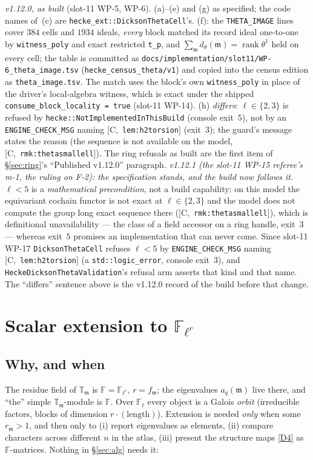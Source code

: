 \documentclass[11pt]{article}
\theoremstyle{remark}
\newcommand{\F}{\mathbb{F}}
\newcommand{\Fl}{\F_\ell}
\newcommand{\Flr}{\F_{\ell^r}}
\DeclareMathOperator{\rank}{rank}
\newcommand{\T}{\mathbb{T}}
\newcommand{\m}{\mathfrak{m}}
\newcommand{\HA}[1]{[C,~\texttt{#1}]}      %
\begin{document}
\emph{v1.12.0, as built} (slot-11 WP-5, WP-6). (a)--(e) and (g) as specified; the code names of~(c)
are \texttt{hecke\_ext::DicksonThetaCell}'s. (f): the \texttt{THETA\_IMAGE} lines cover $384$ cells and
$1934$ ideals, \emph{every} block matched its record ideal one-to-one by \texttt{witness\_poly} and exact
restricted \texttt{t\_p}, and $\sum_\m d_\theta(\m)=\rank\theta^1$ held on every cell; the table is
committed as \texttt{docs/implementation/slot11/WP-6\_theta\_image.tsv} (\texttt{hecke\_census\_theta/v1})
and copied into the census edition as \texttt{theta\_image.tsv}. The match uses the block's own
\texttt{witness\_poly} in place of the driver's local-algebra witness, which is exact under the shipped
\texttt{consume\_block\_locality = true} (slot-11 WP-14). (h) \emph{differs}: $\ell\in\{2,3\}$ is refused
by \texttt{hecke::NotImplementedInThisBuild} (console exit~$5$), not by an \texttt{ENGINE\_CHECK\_MSG} naming
\HA{lem:h2torsion} (exit~$3$); the guard's message states the reason (the sequence is not available on the
model, \HA{rmk:thetasmallell}). The ring refusals as built are the first item of \S\ref{sec:ring}'s
``Published v1.12.0'' paragraph.
\emph{v1.12.1 (the slot-11 WP-15 referee's m-1, the ruling on F-2): the specification stands, and the
build now follows it.} $\ell<5$ is a \emph{mathematical precondition}, not a build capability: on this
model the equivariant cochain functor is not exact at $\ell\in\{2,3\}$ and the model does not compute the
group long exact sequence there (\HA{rmk:thetasmallell}), which is definitional unavailability --- the
class of a field accessor on a ring handle, exit~$3$ --- whereas exit~$5$ promises an implementation that
can never come. Since slot-11 WP-17 \texttt{DicksonThetaCell} refuses $\ell<5$ by
\texttt{ENGINE\_CHECK\_MSG} naming \HA{lem:h2torsion} (a \texttt{std::logic\_error}, console exit~$3$), and
\texttt{HeckeDicksonThetaValidation}'s refusal arm asserts that kind and that name. The ``differs''
sentence above is the v1.12.0 record of the build before that change.

\section{Scalar extension to \texorpdfstring{$\Flr$}{F(l\textasciicircum r)}}\label{sec:field}

\subsection{Why, and when}
The residue field of $\T_\m$ is $\F=\Flr$, $r=f_\m$; the eigenvalues $a_q(\m)$ live there, and
``the'' simple $\T_\m$-module is $\F$. Over $\Fl$ every object is a Galois \emph{orbit}
(irreducible factors, blocks of dimension $r\cdot(\text{length})$). Extension is needed
\emph{only} when some $r_\m>1$, and then only to (i) report eigenvalues as elements, (ii)
compare characters across different $n$ in the atlas, (iii) present the structure maps
\ref{D4} as $\F$-matrices. Nothing in \S\ref{sec:alg} needs it:
\end{document}
